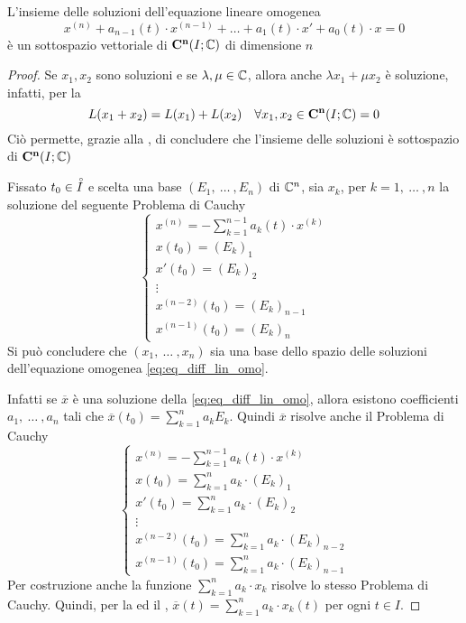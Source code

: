 \begin{proposition}
	L'insieme delle soluzioni dell'equazione lineare omogenea
	\begin{equation}
		\label{eq:eq_diff_lin_omo}
		x^{(n)} + a_{n-1}(t) \cdot x^{(n-1)} + \dotsc + a_1(t) \cdot x' + a_0(t) \cdot x = 0
	\end{equation}
	è un sottospazio vettoriale di $\mathbf{C^{n}}(I;\mathbb{C})$ di dimensione $n$
	\begin{proof}
		Se $x_1, x_2$ sono soluzioni e se $\lambda, \mu \in \mathbb{C}$, allora anche $\lambda x_1 + \mu x_2$ è soluzione, infatti, per la 
		\[L(x_1+x_2) = L(x_1)+L(x_2) \quad\forall x_1,x_2\in \mathbf{C^{n}}(I;\mathbb{C}) = 0\]
		Ciò permette, grazie alla , di concludere che l'insieme delle soluzioni è sottospazio di $\mathbf{C^{n}}(I;\mathbb{C})$

		Fissato $t_0 \in \accentset{\circ}{I}$ e scelta una base $(E_1,\:\dotsc\:,E_n)$ di $\mathbb{C}^n$, sia $x_k$, per $k=1,\:\dotsc\:,n$ la soluzione del seguente Problema di Cauchy
		\begin{equation*}
		\begin{cases}
			x^{(n)} = -\sum_{k=1}^{n-1} a_k(t) \cdot x^{(k)}\\
			x(t_0) = (E_k)_1\\
			x'(t_0) = (E_k)_2\\
			\vdots\\
			x^{(n-2)}(t_0) = (E_k)_{n-1}\\
			x^{(n-1)}(t_0) = (E_k)_{n}
		\end{cases}
		\end{equation*}
		Si può concludere che $(x_1,\:\dotsc\:,x_n)$ sia una base dello spazio delle soluzioni dell'equazione omogenea \cref{eq:eq_diff_lin_omo}.

		Infatti se $\overline{x}$ è una soluzione della \cref{eq:eq_diff_lin_omo}, allora esistono coefficienti $a_1,\:\dotsc\:,a_n$ tali che $\overline{x}(t_0) = \sum\limits_{k=1}^{n}a_k E_k$. Quindi $\overline{x}$ risolve anche il Problema di Cauchy
		\begin{equation*}
		\begin{cases}
			x^{(n)} = -\sum_{k=1}^{n-1} a_k(t) \cdot x^{(k)}\\
			x(t_0) = \sum_{k=1}^{n} a_k \cdot (E_k)_1\\
			x'(t_0) = \sum_{k=1}^{n} a_k \cdot (E_k)_2\\
			\vdots\\
			x^{(n-2)}(t_0) = \sum_{k=1}^{n} a_k \cdot (E_k)_{n-2}\\
			x^{(n-1)}(t_0) = \sum_{k=1}^{n} a_k \cdot (E_k)_{n-1}
		\end{cases}
		\end{equation*}
		Per costruzione anche la funzione $\sum\limits_{k=1}^{n} a_k \cdot x_k$ risolve lo stesso Problema di Cauchy. Quindi, per la  ed il , $\overline{x}(t) = \sum\limits_{k=1}^{n} a_k \cdot x_k(t)$ per ogni $t \in I$.


\end{proof}
\end{proposition}
